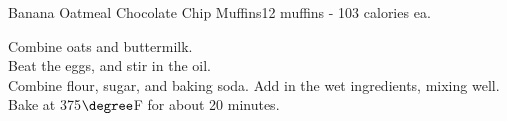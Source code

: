 \begin{recipe}{Banana Oatmeal Chocolate Chip Muffins}{12 muffins - 103 calories ea.}{}


Combine oats and buttermilk.\\

Beat the eggs, and stir in the oil.\\

Combine flour, sugar, and baking soda. Add in the wet ingredients, mixing well.\\

Bake at 375$\degree$F for about 20 minutes.

\end{recipe}